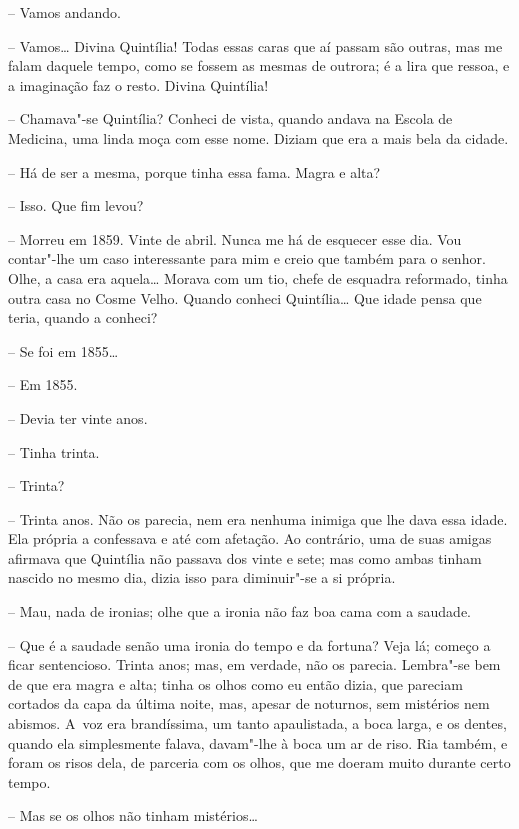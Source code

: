-- Vamos andando.

-- Vamos\ldots{} Divina Quintília! Todas essas caras que aí passam são
outras, mas me falam daquele tempo, como se fossem as mesmas de outrora;
é a lira que ressoa, e a imaginação faz o resto. Divina Quintília!

-- Chamava"-se Quintília? Conheci de vista, quando andava na Escola de
Medicina, uma linda moça com esse nome. Diziam que era a mais bela da
cidade.

-- Há de ser a mesma, porque tinha essa fama. Magra e alta?

-- Isso. Que fim levou?

-- Morreu em 1859. Vinte de abril. Nunca me há de esquecer esse dia. Vou
contar"-lhe um caso interessante para mim e creio que também para o
senhor. Olhe, a casa era aquela\ldots{} Morava com um tio, chefe de esquadra
reformado, tinha outra casa no Cosme Velho. Quando conheci Quintília\ldots{}
Que idade pensa que teria, quando a conheci?

-- Se foi em 1855\ldots{}

-- Em 1855.

-- Devia ter vinte anos.

-- Tinha trinta.

-- Trinta?

-- Trinta anos. Não os parecia, nem era nenhuma inimiga que lhe dava
essa idade. Ela própria a confessava e até com afetação. Ao contrário,
uma de suas amigas afirmava que Quintília não passava dos vinte e sete;
mas como ambas tinham nascido no mesmo dia, dizia isso para diminuir"-se
a si própria.

-- Mau, nada de ironias; olhe que a ironia não faz boa cama com a
saudade.

-- Que é a saudade senão uma ironia do tempo e da fortuna? Veja lá;
começo a ficar sentencioso. Trinta anos; mas, em verdade, não os
parecia. Lembra"-se bem de que era magra e alta; tinha os olhos como eu
então dizia, que pareciam cortados da capa da última noite, mas, apesar
de noturnos, sem mistérios nem abismos. A~voz era brandíssima, um tanto
apaulistada, a boca larga, e os dentes, quando ela simplesmente falava,
davam"-lhe à boca um ar de riso. Ria também, e foram os risos dela, de
parceria com os olhos, que me doeram muito durante certo tempo.

-- Mas se os olhos não tinham mistérios\ldots{}

